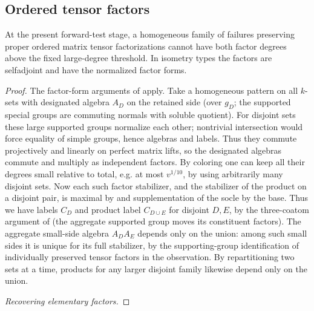 \subsection{Ordered tensor factors}
\begin{proposition}
\label{fb:both-high-factors}
At the present forward-test stage, a homogeneous family of failures preserving
proper ordered matrix tensor factorizations cannot have both factor degrees
above the fixed large-degree threshold.  In isometry types the factors are
selfadjoint and have the normalized factor forms.
\end{proposition}
\begin{proof}

The factor-form arguments of  apply. Take a homogeneous pattern on all \(k\)-sets with designated algebra \(A_D\) on the retained side (over \(g_D\); the supported special groups are commuting normals with soluble quotient). For disjoint sets these large supported groups normalize each other; nontrivial intersection would force equality of simple groups, hence algebras and labels. Thus they commute projectively and linearly on perfect matrix lifts, so the designated algebras commute and multiply as independent factors. By coloring one can keep all their degrees small relative to total, e.g. at most \(v^{1/10}\), by using arbitrarily many disjoint sets. Now each such factor stabilizer, and the stabilizer of the product on a disjoint pair, is maximal by  and supplementation of the socle by the base. Thus we have labels \(C_D\) and product label \(C_{D\cup E}\) for disjoint \(D,E\), by the three-coatom argument of  (the aggregate supported group moves its constituent factors). The aggregate small-side algebra \(A_D A_E\) depends only on the union: among such small sides it is unique for its full stabilizer, by the supporting-group identification of individually preserved tensor factors in the observation. By repartitioning two sets at a time, products for any larger disjoint family likewise depend only on the union.

\noindent\emph{Recovering elementary factors.}


\end{proof}
